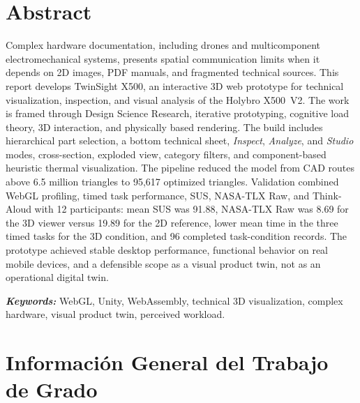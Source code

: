 ﻿\documentclass[12pt,letterpaper]{article}
\begin{document}
\section*{Abstract}
\setlength{\parindent}{0pt}
Complex hardware documentation, including drones and multicomponent electromechanical systems, presents spatial communication limits when it depends on 2D images, PDF manuals, and fragmented technical sources. This report develops TwinSight X500, an interactive 3D web prototype for technical visualization, inspection, and visual analysis of the Holybro X500~V2. The work is framed through Design Science Research, iterative prototyping, cognitive load theory, 3D interaction, and physically based rendering. The build includes hierarchical part selection, a bottom technical sheet, \textit{Inspect}, \textit{Analyze}, and \textit{Studio} modes, cross-section, exploded view, category filters, and component-based heuristic thermal visualization. The pipeline reduced the model from CAD routes above 6.5 million triangles to 95,617 optimized triangles. Validation combined WebGL profiling, timed task performance, SUS, NASA-TLX Raw, and Think-Aloud with 12 participants: mean SUS was 91.88, NASA-TLX Raw was 8.69 for the 3D viewer versus 19.89 for the 2D reference, lower mean time in the three timed tasks for the 3D condition, and 96 completed task-condition records. The prototype achieved stable desktop performance, functional behavior on real mobile devices, and a defensible scope as a visual product twin, not as an operational digital twin.

\hspace{1.27cm}\textit{\textbf{Keywords:}} WebGL, Unity, WebAssembly, technical 3D visualization, complex hardware, visual product twin, perceived workload.

\newpage

\setlength{\parindent}{1.27cm}

\newpage
\tableofcontents
\newpage

\newpage
\renewcommand{\listtablename}{Lista de Tablas}
\listoftables
\newpage

\newpage
\renewcommand{\listfigurename}{Lista de Figuras}
\listoffigures
\newpage

\newpage
\section*{Información General del Trabajo de Grado}
\end{document}
